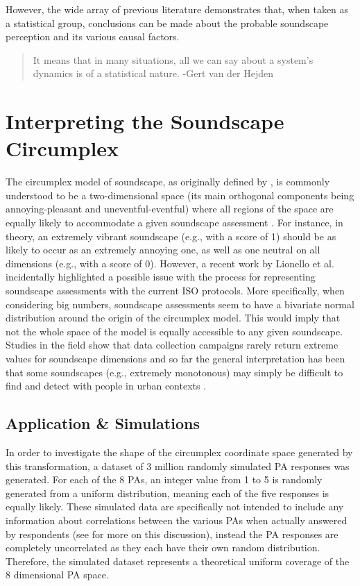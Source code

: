 However, the wide array of previous literature demonstrates that, when taken as a statistical group, conclusions can be made about the probable soundscape perception and its various causal factors.

\begin{quote}
    It means that in many situations, all we can say about a system's dynamics is of a statistical nature. -Gert van der Hejden
\end{quote}

\section{Interpreting the Soundscape Circumplex}
The circumplex model of soundscape, as originally defined by \citet{Axelsson2010principal}, is commonly understood to be a two-dimensional space (its main orthogonal components being annoying-pleasant and uneventful-eventful) where all regions of the space are equally likely to accommodate a given soundscape assessment \citep{Aletta2016Soundscape}. For instance, in theory, an extremely vibrant soundscape (e.g., with a score of 1) should be as likely to occur as an extremely annoying one, as well as one neutral on all dimensions (e.g., with a score of 0). However, a recent work by Lionello et al. \citep{Lionello2021Introducing} incidentally highlighted a possible issue with the process for representing soundscape assessments with the current ISO protocols. More specifically, when considering big numbers, soundscape assessments seem to have a bivariate normal distribution around the origin of the circumplex model. This would imply that not the whole space of the model is equally accessible to any given soundscape. Studies in the field show that data collection campaigns rarely return extreme values for soundscape dimensions \citep{Mancini2021Soundwalk} and so far the general interpretation has been that some soundscapes (e.g., extremely monotonous) may simply be difficult to find and detect with people in urban contexts \citep{Sun2019Classification}. 

\subsection{Application \& Simulations}
In order to investigate the shape of the circumplex coordinate space generated by this transformation, a dataset of 3 million randomly simulated PA responses was generated. For each of the 8 PAs, an integer value from 1 to 5 is randomly generated from a uniform distribution, meaning each of the five responses is equally likely. These simulated data are specifically not intended to include any information about correlations between the various PAs when actually answered by respondents (see \citep{Lionello2021Introducing} for more on this discussion), instead the PA responses are completely uncorrelated as they each have their own random distribution. Therefore, the simulated dataset represents a theoretical uniform coverage of the 8 dimensional PA space.

